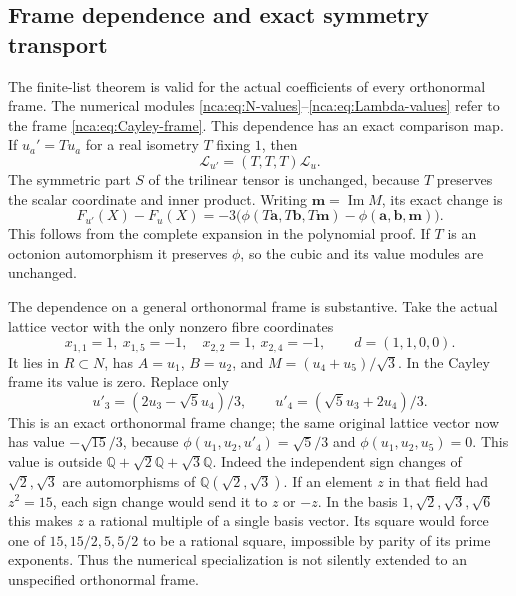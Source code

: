 \subsection{Frame dependence and exact symmetry transport}

The finite-list theorem is valid for the actual coefficients of
every orthonormal frame. The numerical modules
\eqref{nca:eq:N-values}--\eqref{nca:eq:Lambda-values} refer to
the frame \eqref{nca:eq:Cayley-frame}.  This dependence has an
exact comparison map. If \(u_a'=Tu_a\) for a real isometry
\(T\) fixing \(1\), then
\[
 \mathcal L_{u'}=(T,T,T)\mathcal L_u.
\]
The symmetric part \(S\) of the trilinear tensor is unchanged,
because \(T\) preserves the scalar coordinate and inner product.
Writing \(\mathbf m=\operatorname{Im}M\), its exact change is
\begin{equation}
 F_{u'}(X)-F_u(X)
  =-3\bigl(\phi(T\mathbf a,T\mathbf b,T\mathbf m)
                  -\phi(\mathbf a,\mathbf b,\mathbf m)\bigr).
 \label{nca:eq:frame-transport}
\end{equation}
This follows from the complete expansion in the polynomial proof.
If \(T\) is an octonion automorphism it preserves \(\phi\), so
the cubic and its value modules are unchanged.

The dependence on a general orthonormal frame is substantive. Take
the actual lattice vector with the only nonzero fibre coordinates
\[
 x_{1,1}=1,\ x_{1,5}=-1,\quad
 x_{2,2}=1,\ x_{2,4}=-1,\qquad d=(1,1,0,0).
\]
It lies in \(R\subset N\), has \(A=u_1\), \(B=u_2\), and
\(M=(u_4+u_5)/\sqrt3\). In the Cayley frame its value is zero.
Replace only
\[
 u'_3=(2u_3-\sqrt5u_4)/3,\qquad
 u'_4=(\sqrt5u_3+2u_4)/3.
\]
This is an exact orthonormal frame change; the same original
lattice vector now has value \(-\sqrt{15}/3\), because
\(\phi(u_1,u_2,u'_4)=\sqrt5/3\) and
\(\phi(u_1,u_2,u_5)=0\). This value is outside
\(\mathbb Q+\sqrt2\mathbb Q+\sqrt3\mathbb Q\). Indeed the
independent sign changes of \(\sqrt2,\sqrt3\) are automorphisms
of \(\mathbb Q(\sqrt2,\sqrt3)\). If an element \(z\) in that
field had \(z^2=15\), each sign change would send it to
\(z\) or \(-z\). In the basis
\(1,\sqrt2,\sqrt3,\sqrt6\) this makes \(z\) a rational
multiple of a single basis vector. Its square would force one
of \(15,15/2,5,5/2\) to be a rational square, impossible by
parity of its prime exponents.
Thus the numerical specialization is not silently extended to
an unspecified orthonormal frame.

